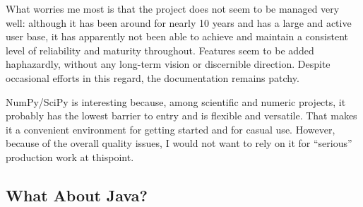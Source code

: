 
What worries me most is that the project does not seem to be managed
very well: although it has been around for nearly 10 years and has a
large and active user base, it has apparently not been able to
achieve and maintain a consistent level of reliability and maturity
throughout.
Features seem to be added haphazardly, without any long-term vision or
discernible direction. Despite occasional efforts in this regard, the
documentation remains patchy.  

%
% 

NumPy/SciPy is interesting because, among scientific and numeric
projects, it probably has the lowest barrier to entry and is flexible
and versatile.  That makes it a convenient environment for getting
started and for casual use.  However, because of the overall quality
issues, I would not want to rely on it for ``serious'' production work
at this\break point.

\subsection{What About Java?}



